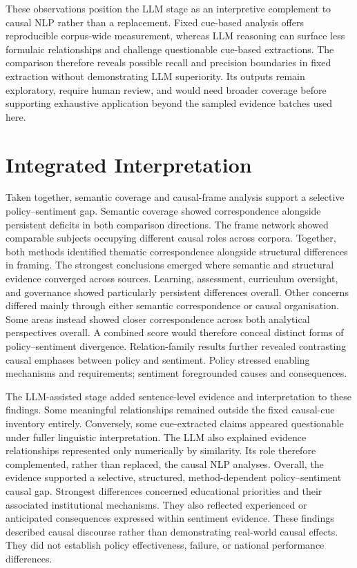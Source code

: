 These observations position the LLM stage as an interpretive complement to causal NLP
rather than a replacement. Fixed cue-based analysis offers reproducible corpus-wide
measurement, whereas LLM reasoning can surface less formulaic relationships and
challenge questionable cue-based extractions. The comparison therefore reveals
possible recall and precision boundaries in fixed extraction without demonstrating
LLM superiority. Its outputs remain exploratory, require human review, and would need
broader coverage before supporting exhaustive application beyond the sampled evidence
batches used here.


\section{Integrated Interpretation}

Taken together, semantic coverage and causal-frame analysis support a selective
policy--sentiment gap. Semantic coverage showed correspondence alongside persistent
deficits in both comparison directions. The frame network showed comparable subjects
occupying different causal roles across corpora. Together, both methods identified
thematic correspondence alongside structural differences in framing. The strongest
conclusions emerged where semantic and structural evidence converged across sources.
Learning, assessment, curriculum oversight, and governance showed particularly
persistent differences overall. Other concerns differed mainly through either
semantic correspondence or causal organisation. Some areas instead showed closer
correspondence across both analytical perspectives overall. A combined score would
therefore conceal distinct forms of policy--sentiment divergence. Relation-family
results further revealed contrasting causal emphases between policy and sentiment.
Policy stressed enabling mechanisms and requirements; sentiment foregrounded causes
and consequences.

The LLM-assisted stage added sentence-level evidence and interpretation to these
findings. Some meaningful relationships remained outside the fixed causal-cue
inventory entirely. Conversely, some cue-extracted claims appeared questionable under
fuller linguistic interpretation. The LLM also explained evidence relationships
represented only numerically by similarity. Its role therefore complemented, rather
than replaced, the causal NLP analyses. Overall, the evidence supported a selective,
structured, method-dependent policy--sentiment causal gap. Strongest differences
concerned educational priorities and their associated institutional mechanisms. They
also reflected experienced or anticipated consequences expressed within sentiment
evidence. These findings described causal discourse rather than demonstrating
real-world causal effects. They did not establish policy effectiveness, failure, or
national performance differences.


